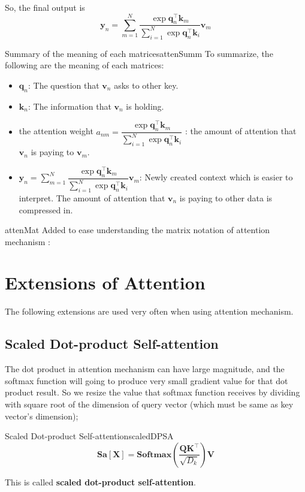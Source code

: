 \documentclass{article}
\begin{document}
            So, the final output is
            \[
                \textbf{y}_n = \sum_{m=1}^{N} \frac{\exp \textbf{q}_n^\top \textbf{k}_m}
                {\sum_{i=1}^{N} \exp{\textbf{q}_n^\top \textbf{k}_i}} \textbf{v}_m
            \]

            \begin{rem}{Summary of the meaning of each matrices}{attenSumm}
                To summarize, the following are the meaning of each matrices:
                \begin{itemize}
                    \item $\textbf{q}_n$: The question that $\textbf{v}_n$ asks to other key.
                    \item $\textbf{k}_n$: The information that $\textbf{v}_n$ is holding.
                    \item the attention weight $a_{nm} = \dfrac{\exp \textbf{q}_n^\top \textbf{k}_m}{\sum_{i=1}^{N} \exp{\textbf{q}_n^\top \textbf{k}_i}}$
                    : the amount of attention that $\textbf{v}_n$ is paying to $\textbf{v}_m$.
                    \item $\textbf{y}_n = \sum_{m=1}^{N} \dfrac{\exp \textbf{q}_n^\top \textbf{k}_m}
                    {\sum_{i=1}^{N} \exp{\textbf{q}_n^\top \textbf{k}_i}} \textbf{v}_m$: Newly created context which is easier to interpret.
                    The amount of attention that $\textbf{v}_n$ is paying to other data is compressed in.
                \end{itemize}
            \end{rem}

            \begin{rem}{}{attenMat}
            Added to ease understanding the matrix notation of attention mechanism :
            \[
            \]
            \end{rem}

\section{Extensions of Attention}
    The following extensions are used very often when using attention mechanism.
    \subsection{Scaled Dot-product Self-attention}
        The dot product in attention mechanism can have large magnitude, and the softmax function will going to produce
        very small gradient value for that dot product result. So we resize the value that softmax function receives by
        dividing with square root of the dimension of query vector (which must be same as key vector's dimension);
        \begin{defn}{Scaled Dot-product Self-attention}{scaledDPSA}
        \[
            \textbf{Sa}[\textbf{X}]=\textbf{Softmax}\left(\frac{\textbf{Q}\textbf{K}^{\top}}{\sqrt{D_k}}\right)\textbf{V}
        \]
        \end{defn}
        This is called \textbf{scaled dot-product self-attention}.
        
\end{document}
